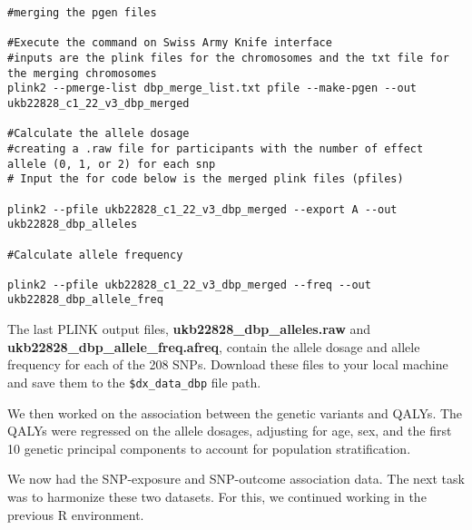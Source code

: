 \documentclass[11pt]{article}
\newcounter{subsubsubsection}[subsubsection]
\begin{document}
\begin{lstlisting}[style=BashStyle]
#merging the pgen files

#Execute the command on Swiss Army Knife interface 
#inputs are the plink files for the chromosomes and the txt file for the merging chromosomes 
plink2 --pmerge-list dbp_merge_list.txt pfile --make-pgen --out ukb22828_c1_22_v3_dbp_merged

#Calculate the allele dosage 
#creating a .raw file for participants with the number of effect allele (0, 1, or 2) for each snp
# Input the for code below is the merged plink files (pfiles)

plink2 --pfile ukb22828_c1_22_v3_dbp_merged --export A --out ukb22828_dbp_alleles

#Calculate allele frequency 

plink2 --pfile ukb22828_c1_22_v3_dbp_merged --freq --out ukb22828_dbp_allele_freq

\end{lstlisting}

\color{black}
\newpage
The last PLINK output files, \textbf{ukb22828\_dbp\_alleles.raw} and \textbf{ukb22828\_dbp\_allele\_freq.afreq}, contain the allele dosage and allele frequency for each of the 208 SNPs. Download these files to your local machine and save them to the \texttt{\$dx\_data\_dbp} file path.


We then worked on the association between the genetic variants and QALYs. The QALYs were regressed on the allele dosages, adjusting for age, sex, and the first 10 genetic principal components to account for population stratification.
\color{violet}
\begin{stlog}\end{stlog}
\color{black}

We now had the SNP-exposure and SNP-outcome association data. The next task was to harmonize these two datasets. For this, we continued working in the previous R environment.
\end{document}

